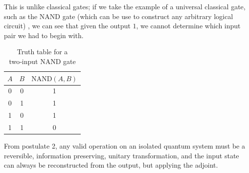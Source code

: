 This is unlike classical gates; if we take the example of a universal classical gate, 
such as the NAND gate (which can be use to construct any arbitrary logical circuit) \cite{Wikipedia:UniversalLogicGates},
we can see that given the output $1$, we cannot determine which input pair we had to begin with. 

\begin{table}[ht]
	\centering
	\begin{tabular}{ccc}
		\toprule
		$A$ & $B$ & $\text{NAND}(A,B)$ \\
		\midrule
		0 & 0 & 1 \\
		0 & 1 & 1 \\
		1 & 0 & 1 \\
		1 & 1 & 0 \\
		\bottomrule
	\end{tabular}
	\vspace{4pt}
	\caption{Truth table for a two‑input \textsc{NAND} gate}
\end{table}







From postulate 2, any valid operation on an isolated quantum system must be a reversible, information preserving,
unitary transformation, and the input state can always be reconstructed from the output, but applying the adjoint.


